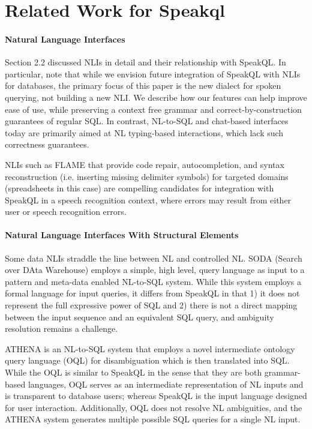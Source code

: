\section{Related Work for Speakql}


\paragraph{\textbf{Natural Language Interfaces}}

Section 2.2 discussed NLIs in detail and their relationship with SpeakQL. 
In particular, note that while we envision future integration of SpeakQL with NLIs for databases, the primary focus of this paper is the new dialect for spoken querying, not building a new NLI. 
We describe how our features can help improve ease of use, while preserving a context free grammar and correct-by-construction guarantees of regular SQL.
In contrast, NL-to-SQL and chat-based interfaces today are primarily aimed at NL typing-based interactions, which lack such correctness guarantees.

NLIs such as FLAME \cite{joshi2023flame} that provide code repair, autocompletion, and syntax reconstruction (i.e. inserting missing delimiter symbols) for targeted domains (spreadsheets in this case) are compelling candidates for integration with SpeakQL in a speech recognition context, where errors may result from either user or speech recognition errors.

\paragraph{\textbf{Natural Language Interfaces With Structural Elements}}

Some data NLIs straddle the line between NL and controlled NL. SODA (Search over DAta Warehouse) \cite{10.14778/2336664.2336667} employs a simple, high level, query language as input to a pattern and meta-data enabled NL-to-SQL system. 
While this system employs a formal language for input queries, it differs from SpeakQL in that 1) it does not represent the full expressive power of SQL and 2) there is not a direct mapping between the input sequence and an equivalent SQL query, and ambiguity resolution remains a challenge. 

ATHENA \cite{10.14778/2994509.2994536} is an NL-to-SQL system that employs a novel intermediate ontology query language (OQL) for disambiguation which is then translated into SQL. While the OQL is similar to SpeakQL in the sense that they are both grammar-based languages, OQL serves as an intermediate representation of NL inputs and is transparent to database users; whereas SpeakQL is the input language designed for user interaction. Additionally, OQL does not resolve NL ambiguities, and the ATHENA system generates multiple possible SQL queries for a single NL input.

